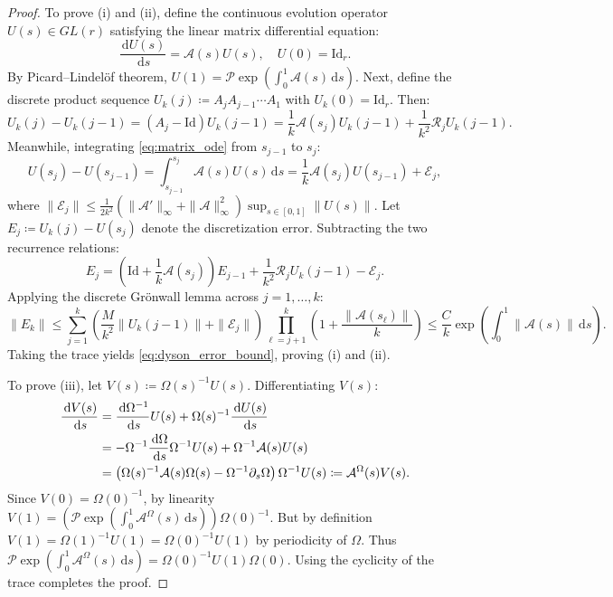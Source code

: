 \documentclass[11pt,a4paper,reqno]{amsart}
\theoremstyle{definition}
\numberwithin{equation}{section}
\newcommand{\Id}{\mathrm{Id}}
\newcommand{\dif}{\,\mathrm{d}}
\begin{document}
\begin{proof}
To prove (i) and (ii), define the continuous evolution operator $U(s) \in GL(r)$ satisfying the linear matrix differential equation:
\begin{equation}
    \label{eq:matrix_ode}
    \frac{\dif U(s)}{\dif s} = \mathcal{A}(s) U(s), \quad U(0) = \Id_r.
\end{equation}
By Picard--Lindel\"of theorem, $U(1) = \mathcal{P} \exp(\int_0^1 \mathcal{A}(s) \dif s)$. Next, define the discrete product sequence $U_k(j) \coloneqq A_j A_{j-1} \cdots A_1$ with $U_k(0) = \Id_r$. Then:
\begin{equation}
    U_k(j) - U_k(j-1) = (A_j - \Id) U_k(j-1) = \frac{1}{k} \mathcal{A}(s_j) U_k(j-1) + \frac{1}{k^2} \mathcal{R}_j U_k(j-1).
\end{equation}
Meanwhile, integrating \eqref{eq:matrix_ode} from $s_{j-1}$ to $s_j$:
\begin{equation}
    U(s_j) - U(s_{j-1}) = \int_{s_{j-1}}^{s_j} \mathcal{A}(s) U(s) \dif s = \frac{1}{k} \mathcal{A}(s_j) U(s_{j-1}) + \mathcal{E}_j,
\end{equation}
where $\|\mathcal{E}_j\| \le \frac{1}{2 k^2} \left( \|\mathcal{A}'\|_\infty + \|\mathcal{A}\|_\infty^2 \right) \sup_{s \in [0, 1]} \|U(s)\|$. Let $E_j \coloneqq U_k(j) - U(s_j)$ denote the discretization error. Subtracting the two recurrence relations:
\begin{equation}
    E_j = \left( \Id + \frac{1}{k} \mathcal{A}(s_j) \right) E_{j-1} + \frac{1}{k^2} \mathcal{R}_j U_k(j-1) - \mathcal{E}_j.
\end{equation}
Applying the discrete Gr\"onwall lemma across $j = 1, \dots, k$:
\begin{equation}
    \|E_k\| \le \sum_{j=1}^k \left( \frac{M}{k^2} \|U_k(j-1)\| + \|\mathcal{E}_j\| \right) \prod_{\ell=j+1}^k \left(1 + \frac{\|\mathcal{A}(s_\ell)\|}{k}\right) \le \frac{C}{k} \exp\left( \int_0^1 \|\mathcal{A}(s)\| \dif s \right).
\end{equation}
Taking the trace yields \eqref{eq:dyson_error_bound}, proving (i) and (ii).

To prove (iii), let $V(s) \coloneqq \Omega(s)^{-1} U(s)$. Differentiating $V(s)$:
\begin{align}
    \frac{\dif V(s)}{\dif s} &= \frac{\dif \Omega^{-1}}{\dif s} U(s) + \Omega(s)^{-1} \frac{\dif U(s)}{\dif s} \notag \\
    &= -\Omega^{-1} \frac{\dif \Omega}{\dif s} \Omega^{-1} U(s) + \Omega^{-1} \mathcal{A}(s) U(s) \notag \\
    &= \left( \Omega(s)^{-1} \mathcal{A}(s) \Omega(s) - \Omega^{-1} \partial_s \Omega \right) \Omega^{-1} U(s) \coloneqq \mathcal{A}^\Omega(s) V(s).
\end{align}
Since $V(0) = \Omega(0)^{-1}$, by linearity $V(1) = \left( \mathcal{P} \exp(\int_0^1 \mathcal{A}^\Omega(s) \dif s) \right) \Omega(0)^{-1}$. But by definition $V(1) = \Omega(1)^{-1} U(1) = \Omega(0)^{-1} U(1)$ by periodicity of $\Omega$. Thus $\mathcal{P} \exp(\int_0^1 \mathcal{A}^\Omega(s) \dif s) = \Omega(0)^{-1} U(1) \Omega(0)$. Using the cyclicity of the trace completes the proof.
\end{proof}
\end{document}
